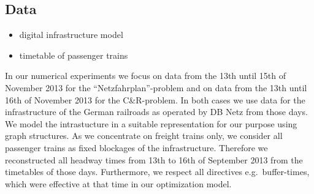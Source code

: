 \subsection{Data}
\begin{itemize}
  \item digital infrastructure model
  \item timetable of passenger trains
\end{itemize}
In our numerical experiments we focus on data from the 13th until 15th of November 2013 for the ``Netzfahrplan''-problem and on data from the 13th until 16th of November 2013 for the C\&R-problem. In both cases we use data for the infrastructure of the German railroads as operated by DB Netz from those days. We model the intrastucture in a suitable representation for our purpose using graph structures. As we concentrate on freight trains only, we consider all passenger trains as fixed blockages of the infrastructure. Therefore we reconstructed all headway times from 13th to 16th of September 2013 from the timetables of those days. Furthermore, we respect all directives e.g.\ buffer-times, which were effective at that time in our optimization model.

